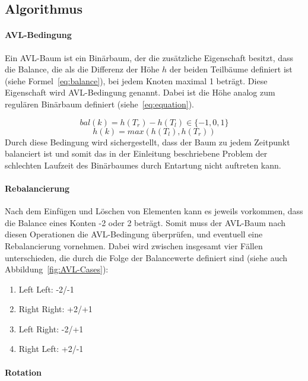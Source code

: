 \subsection{Algorithmus}\label{subsec:algorithmus}

\paragraph{AVL-Bedingung}
Ein AVL-Baum ist ein Binärbaum, der die zusätzliche Eigenschaft besitzt, dass
die Balance, die als die Differenz der Höhe $h$ der beiden
Teilbäume definiert ist (siehe Formel~\ref{eq:balance}), bei jedem Knoten maximal 1 beträgt.
Diese Eigenschaft wird AVL-Bedingung genannt.
Dabei ist die Höhe analog zum regulären Binärbaum definiert (siehe~\ref{eq:equation}).

\begin{equation}
    bal(k) = h(T_r) - h(T_l)\label{eq:balance} \in \{-1,0,1\}
\end{equation}
\begin{equation}
    h(k) = max(h(T_l), h(T_r))\label{eq:equation}
\end{equation}
Durch diese Bedingung wird sichergestellt, dass der Baum zu jedem Zeitpunkt
balanciert ist und somit das in der Einleitung beschriebene Problem der
schlechten Laufzeit des Binärbaumes durch Entartung nicht auftreten kann.

\paragraph{Rebalancierung}
Nach dem Einfügen und Löschen von Elementen kann es jeweils vorkommen, dass die
Balance eines Konten -2 oder 2 beträgt.
Somit muss der AVL-Baum nach diesen Operationen die AVL-Bedingung überprüfen,
und eventuell eine Rebalancierung vornehmen.
Dabei wird zwischen insgesamt vier Fällen unterschieden, die durch die Folge
der Balancewerte definiert sind (siehe auch Abbildung~\ref{fig:AVL-Cases}):
\begin{enumerate}
    \item Left Left: -2/-1
    \item Right Right: +2/+1
    \item Left Right: -2/+1
    \item Right Left: +2/-1
\end{enumerate}

\paragraph*{Rotation}

